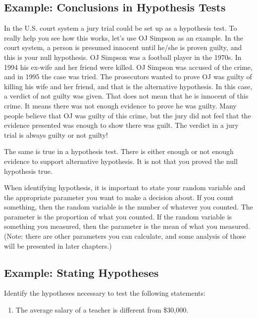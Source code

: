 \documentclass[]{book}
\providecommand{\tightlist}{%
  \setlength{\itemsep}{0pt}\setlength{\parskip}{0pt}}
\begin{document}
\hypertarget{example-conclusions-in-hypothesis-tests}{%
\subsection{Example: Conclusions in Hypothesis Tests}\label{example-conclusions-in-hypothesis-tests}}

In the U.S. court system a jury trial could be set up as a hypothesis test. To really help you see how this works, let's use OJ Simpson as an example. In the court system, a person is presumed innocent until he/she is proven guilty, and this is your null hypothesis. OJ Simpson was a football player in the 1970s. In 1994 his ex-wife and her friend were killed. OJ Simpson was accused of the crime, and in 1995 the case was tried. The prosecutors wanted to prove OJ was guilty of killing his wife and her friend, and that is the alternative hypothesis.
In this case, a verdict of not guilty was given. That does not mean that he is innocent of this crime. It means there was not enough evidence to prove he was guilty. Many people believe that OJ was guilty of this crime, but the jury did not feel that the evidence presented was enough to show there was guilt. The verdict in a jury trial is always guilty or not guilty!

The same is true in a hypothesis test. There is either enough or not enough evidence to support alternative hypothesis. It is not that you proved the null hypothesis true.

When identifying hypothesis, it is important to state your random variable and the appropriate parameter you want to make a decision about. If you count something, then the random variable is the number of whatever you counted. The parameter is the proportion of what you counted. If the random variable is something you measured, then the parameter is the mean of what you measured. (Note: there are other parameters you can calculate, and some analysis of those will be presented in later chapters.)

\hypertarget{example-stating-hypotheses}{%
\subsection{Example: Stating Hypotheses}\label{example-stating-hypotheses}}

Identify the hypotheses necessary to test the following statements:

\begin{enumerate}
\def\labelenumi{\alph{enumi}.}
\tightlist
\item
  The average salary of a teacher is different from \$30,000.
\end{enumerate}
\end{document}
